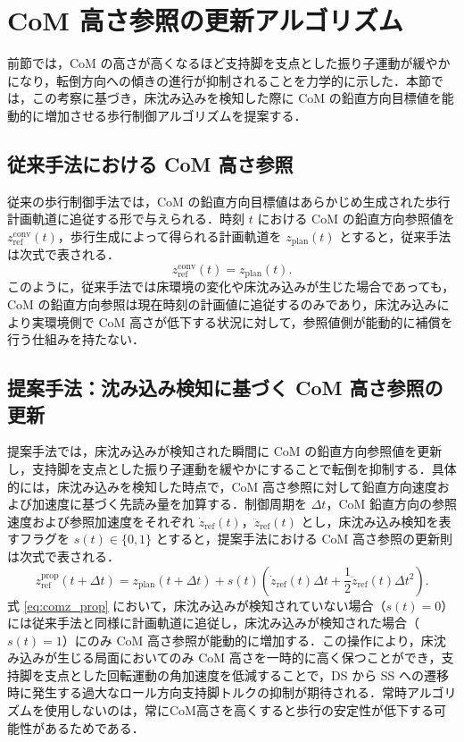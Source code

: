 \section{CoM 高さ参照の更新アルゴリズム}
\label{sec:comz_update_algorithm}

前節では，CoM の高さが高くなるほど支持脚を支点とした振り子運動が緩やかになり，転倒方向への傾きの進行が抑制されることを力学的に示した．本節では，この考察に基づき，床沈み込みを検知した際に CoM の鉛直方向目標値を能動的に増加させる歩行制御アルゴリズムを提案する．

\subsection{従来手法における CoM 高さ参照}
\label{subsec:comz_conventional}

従来の歩行制御手法では，CoM の鉛直方向目標値はあらかじめ生成された歩行計画軌道に追従する形で与えられる．時刻 $t$ における CoM の鉛直方向参照値を $z_{\mathrm{ref}}^{\mathrm{conv}}(t)$，歩行生成によって得られる計画軌道を $z_{\mathrm{plan}}(t)$ とすると，従来手法は次式で表される．
\begin{equation}
z_{\mathrm{ref}}^{\mathrm{conv}}(t)=z_{\mathrm{plan}}(t).
\label{eq:comz_conv}
\end{equation}
このように，従来手法では床環境の変化や床沈み込みが生じた場合であっても，CoM の鉛直方向参照は現在時刻の計画値に追従するのみであり，床沈み込みにより実環境側で CoM 高さが低下する状況に対して，参照値側が能動的に補償を行う仕組みを持たない．

\subsection{提案手法：沈み込み検知に基づく CoM 高さ参照の更新}
\label{subsec:comz_proposed}

提案手法では，床沈み込みが検知された瞬間に CoM の鉛直方向参照値を更新し，支持脚を支点とした振り子運動を緩やかにすることで転倒を抑制する．具体的には，床沈み込みを検知した時点で，CoM 高さ参照に対して鉛直方向速度および加速度に基づく先読み量を加算する．制御周期を $\Delta t$，CoM 鉛直方向の参照速度および参照加速度をそれぞれ $\dot{z}_{\mathrm{ref}}(t)$，$\ddot{z}_{\mathrm{ref}}(t)$ とし，床沈み込み検知を表すフラグを $s(t)\in\{0,1\}$ とすると，提案手法における CoM 高さ参照の更新則は次式で表される．
\begin{equation}
z_{\mathrm{ref}}^{\mathrm{prop}}(t+\Delta t)=z_{\mathrm{plan}}(t+\Delta t)+s(t)\left(\dot{z}_{\mathrm{ref}}(t)\Delta t+\frac{1}{2}\ddot{z}_{\mathrm{ref}}(t)\Delta t^2\right).
\label{eq:comz_prop}
\end{equation}
式 \eqref{eq:comz_prop} において，床沈み込みが検知されていない場合（$s(t)=0$）には従来手法と同様に計画軌道に追従し，床沈み込みが検知された場合（$s(t)=1$）にのみ CoM 高さ参照が能動的に増加する．この操作により，床沈み込みが生じる局面においてのみ CoM 高さを一時的に高く保つことができ，支持脚を支点とした回転運動の角加速度を低減することで，DS から SS への遷移時に発生する過大なロール方向支持脚トルクの抑制が期待される．常時アルゴリズムを使用しないのは，常にCoM高さを高くすると歩行の安定性が低下する可能性があるためである．

